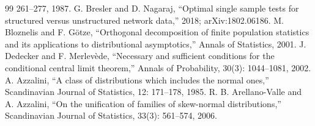 \begin{thebibliography}{99}
261--277, 1987.
 G. Bresler and D. Nagaraj, ``Optimal single sample tests
for structured versus unstructured network data,'' 2018;
arXiv:1802.06186.
 M. Bloznelis and F. G\"otze, ``Orthogonal decomposition
of finite population statistics and its applications to distributional
asymptotics,'' Annals of Statistics, 2001.
 J. Dedecker and F. Merlev\`ede, ``Necessary and
sufficient conditions for the conditional central limit theorem,''
Annals of Probability, 30(3): 1044--1081, 2002.
 A. Azzalini, ``A class of distributions which includes
the normal ones,'' Scandinavian Journal of Statistics, 12: 171--178,
1985.
 R. B. Arellano-Valle and A. Azzalini, ``On the
unification of families of skew-normal distributions,'' Scandinavian
Journal of Statistics, 33(3): 561--574, 2006.
\end{thebibliography}

